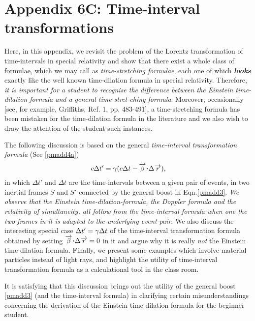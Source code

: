 \section{Appendix 6C:  Time-interval\\ transformations}

Here, in this appendix, we revisit the problem of the 
Lorentz transformation of time-intervals in special 
relativity and show that there exist a whole class of 
formulae, which we may call as \textsl{time-stretching 
formulae}, each one of which  \textbf{\textsl{looks}} 
exactly like the well known time-dilation formula in 
special 
relativity. Therefore, \textsl{it is  important for a 
student to recognise the difference  between the 
Einstein 
time-dilation formula and a general time-stret-\break ching 
formula}. Moreover, occasionally [see, for example, 
Griffiths, Ref. 1, pp. 483-491], a time-stretching 
formula 
has been mistaken for the time-dilation formula in the 
literature and we also wish to draw the attention of 
the 
student such  instances.

The following discussion is based on the general 
\textsl{time-interval transformation formula} (See 
\eqref{pmadd4a})
\begin{align*}
c\Delta t' = \gkg (c\Delta t
- \veca{\gkb} \dotp \Delta \veca{r}),
\end{align*}
in which $\Delta t'$ and $\Delta t$ are the 
time-intervals 
between a  given pair of events, in two inertial frames 
$S$ 
and $S'$ connected by the  general boost in 
Eqn.\eqref{pmadd3}. 
\textsl{We observe that the Einstein 
time-dilation-formula, 
the Doppler formula and the relativity of simultaneity, 
all 
follow from the time-interval formula when one the two 
frames in it is \textsl{adapted} to the underlying 
event-pair}. We also discuss the interesting special 
case 
$\Delta t' = {\gamma} \Delta t$ of the time-interval 
transformation formula obtained by setting 
$\veca{\gkb} 
\dotp 
\Delta \veca{r}=0$ in it and argue why it is really 
\textsl{not} the Einstein time-dilation formula. 
Finally, 
we 
present some examples which involve material particles 
instead of light rays, and highlight the utility of 
time-interval transformation formula as a 
calculational 
tool 
in the class room.

It is satisfying that this discussion brings out the 
utility 
of the general boost \eqref{pmadd3} (and the 
time-interval 
formula) in clarifying certain misunderstandings 
concerning 
the derivation of the Einstein time-dilation formula 
for 
the 
beginner student.

